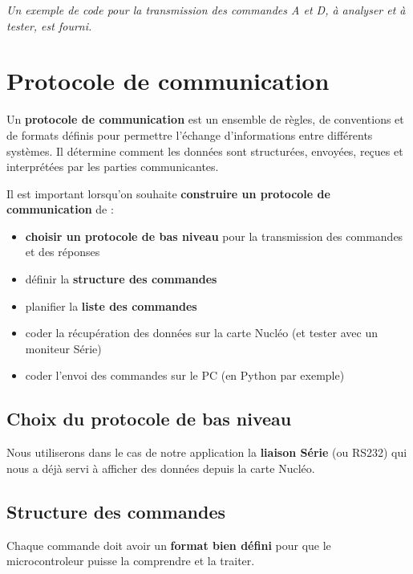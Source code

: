\documentclass[a4paper,11pt,titlepage]{article} %
\begin{document}
\textit{Un exemple de code pour la transmission des commandes A et D, à analyser et à tester, est fourni.}

\section{Protocole de communication}

Un \textbf{protocole de communication} est un ensemble de règles, de conventions et de formats définis pour permettre l'échange d'informations entre différents systèmes. Il détermine comment les données sont structurées, envoyées, reçues et interprétées par les parties communicantes.

\medskip

Il est important lorsqu'on souhaite \textbf{construire un protocole de communication} de :

\begin{itemize}
	\item \textbf{choisir un protocole de bas niveau} pour la transmission des commandes et des réponses
	\item définir la \textbf{structure des commandes}
	\item planifier la \textbf{liste des commandes}
	\item coder la récupération des données sur la carte Nucléo (et tester avec un moniteur Série)
	\item coder l'envoi des commandes sur le PC (en Python par exemple)
\end{itemize}


\subsection{Choix du protocole de bas niveau}

Nous utiliserons dans le cas de notre application la \textbf{liaison Série} (ou RS232) qui nous a déjà servi à afficher des données depuis la carte Nucléo.

\subsection{Structure des commandes}

Chaque commande doit avoir un \textbf{format bien défini} pour que le microcontroleur puisse la comprendre et la traiter.

\begin{center}
\end{center}
\end{document}
